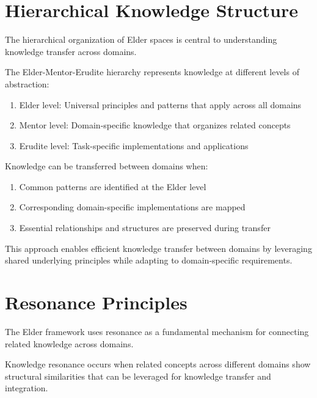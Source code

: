 \section{Hierarchical Knowledge Structure}

The hierarchical organization of Elder spaces is central to understanding knowledge transfer across domains.

\begin{theorem}
The Elder-Mentor-Erudite hierarchy represents knowledge at different levels of abstraction:
\begin{enumerate}
    \item Elder level: Universal principles and patterns that apply across all domains
    \item Mentor level: Domain-specific knowledge that organizes related concepts
    \item Erudite level: Task-specific implementations and applications
\end{enumerate}
\end{theorem}

\begin{corollary}
Knowledge can be transferred between domains when:
\begin{enumerate}
    \item Common patterns are identified at the Elder level
    \item Corresponding domain-specific implementations are mapped
    \item Essential relationships and structures are preserved during transfer
\end{enumerate}
\end{corollary}

This approach enables efficient knowledge transfer between domains by leveraging shared underlying principles while adapting to domain-specific requirements.

\section{Resonance Principles}

The Elder framework uses resonance as a fundamental mechanism for connecting related knowledge across domains.

\begin{definition}
Knowledge resonance occurs when related concepts across different domains show structural similarities that can be leveraged for knowledge transfer and integration.
\end{definition}

